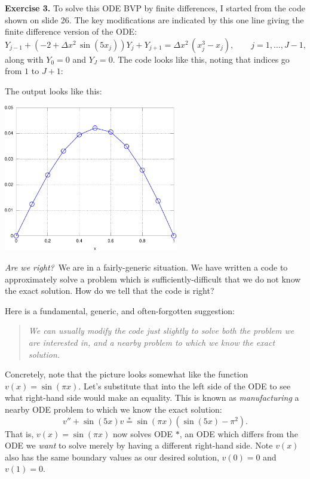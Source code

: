 \documentclass[11pt]{amsart}
\newcommand{\mfile}[1]{
\begin{quote}
\bigskip \bigskip
\VerbatimInput[frame=single,label=\fbox{\normalsize \textsl{\,#1\,}},fontfamily=courier,fontsize=\small]{#1}
\end{quote}
\bigskip
}
\newcommand{\prob}[1]{\bigskip\noindent\textbf{#1.} }
\begin{document}
\prob{Exercise 3}  To solve this ODE BVP by finite differences, I started from the code shown on slide 26.  The key modifications are indicated by this one line giving the finite difference version of the ODE:
	$$Y_{j-1} + \left(-2 + \Delta x^2\,\sin(5x_j)\right) Y_j + Y_{j+1} = \Delta x^2\,\left(x_j^3 - x_j\right), \qquad j=1,\dots,J-1,$$
along with $Y_0=0$ and $Y_J=0$.  The code looks like this, noting that indices go from $1$ to $J+1$:

\mfile{exer3.m}

The output looks like this:
\medskip

\begin{center}
\includegraphics[width=3.0in,keepaspectratio=true]{exer3}
\end{center}
\medskip

\large\emph{Are we right?}\normalsize\,  We are in a fairly-generic situation.  We have written a code to approximately solve a problem which is sufficiently-difficult that we do not know the exact solution.  How do we tell that the code is right?

Here is a fundamental, generic, and often-forgotten suggestion: 
\begin{quote}
\emph{We can usually modify the code just slightly to solve both the problem we are interested in, and a nearby problem to which we know the exact solution.}
\end{quote}
Concretely, note that the picture looks somewhat like the function $v(x) = \sin(\pi x)$.  Let's substitute that into the left side of the ODE to see what right-hand side would make an equality.  This is known as \emph{manufacturing} a nearby ODE problem to which we know the exact solution:
	$$v'' + \sin(5 x) v \stackrel{\ast}{=} \sin(\pi x) \left(\sin(5 x) - \pi^2\right).$$
That is, $v(x) = \sin(\pi x)$ now solves ODE $\ast$, an ODE which differs from the ODE we \emph{want} to solve merely by having a different right-hand side.  Note $v(x)$ also has the same boundary values as our desired solution, $v(0)=0$ and $v(1)=0$.
\end{document}
